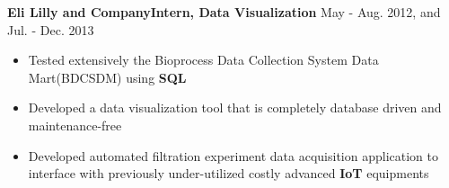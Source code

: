 \documentclass[10.5pt]{res} %
\begin{document}
\begin{resume}
    \textbf{Eli Lilly and Company}\quad\quad \textbf{Intern, Data Visualization  %
    }\hfill May - Aug. 2012, and Jul. - Dec. 2013
    \begin{itemize} pt
    	\item Tested extensively the Bioprocess Data Collection System Data Mart(BDCSDM) using \textbf{SQL} %
    	\item  Developed a data visualization tool that is completely database driven and maintenance-free %
    	\item Developed automated filtration experiment data acquisition application to interface with previously under-utilized costly advanced \textbf{IoT} equipments %
    \end{itemize}

\end{resume}
\end{document}
